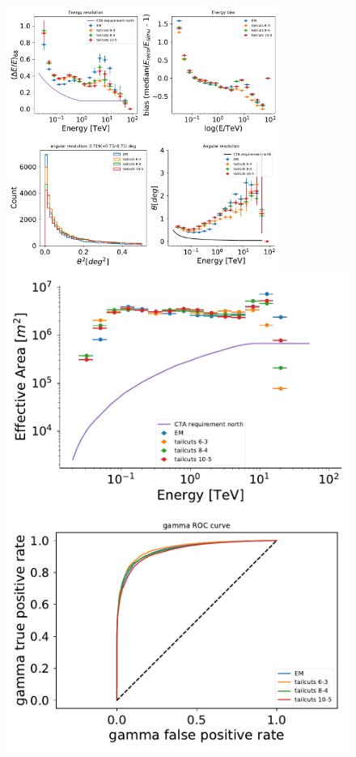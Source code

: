 \documentclass[main.tex]{subfiles}
\begin{document}
\begin{figure}
\centering
\includegraphics[width=0.8\textwidth]{Pictures/em_energy_resolution.pdf}
\includegraphics[width=0.8\textwidth]{Pictures/em_angular_resolution.pdf}
\includegraphics[width=1\textwidth]{Pictures/em_effective_area.pdf}
\endminipage
{}
\includegraphics[width=1\textwidth]{Pictures/em_ROC.pdf}

\end{figure}
\end{document}

